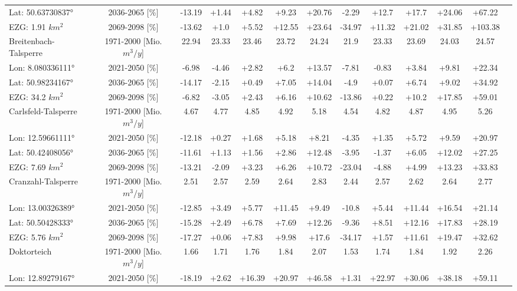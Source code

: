 \begin{longtable}{@{\extracolsep{\fill}}lc|ccccc||cccccc}
Lat: 50.63730837° & 2036-2065 [\%]  & -13.19 & +1.44 & +4.82 & +9.23 & +20.76 & -2.29 & +12.7 & +17.7 & +24.06 & +67.22 & \\ 
EZG: 1.91 $km^2$ & 2069-2098 [\%]  & -13.62 & +1.0 & +5.52 & +12.55 & +23.64 & -34.97 & +11.32 & +21.02 & +31.85 & +103.38 & \\ 
\hline 
Breitenbach-Talsperre & 1971-2000 [Mio. $m^3/y$]  & 22.94 & 23.33 & 23.46 & 23.72 & 24.24 & 21.9 & 23.33 & 23.69 & 24.03 & 24.57 & \\ 
\cline{2-13} 
Lon: 8.080336111° & 2021-2050 [\%]  & -6.98 & -4.46 & +2.82 & +6.2 & +13.57 & -7.81 & -0.83 & +3.84 & +9.81 & +22.34 & \\ 
Lat: 50.98234167° & 2036-2065 [\%]  & -14.17 & -2.15 & +0.49 & +7.05 & +14.04 & -4.9 & +0.07 & +6.74 & +9.02 & +34.92 & \\ 
EZG: 34.2 $km^2$ & 2069-2098 [\%]  & -6.82 & -3.05 & +2.43 & +6.16 & +10.62 & -13.86 & +0.22 & +10.2 & +17.85 & +59.01 & \\ 
\hline 
Carlsfeld-Talsperre & 1971-2000 [Mio. $m^3/y$]  & 4.67 & 4.77 & 4.85 & 4.92 & 5.18 & 4.54 & 4.82 & 4.87 & 4.95 & 5.26 & \\ 
\cline{2-13} 
Lon: 12.59661111° & 2021-2050 [\%]  & -12.18 & +0.27 & +1.68 & +5.18 & +8.21 & -4.35 & +1.35 & +5.72 & +9.59 & +20.97 & \\ 
Lat: 50.42408056° & 2036-2065 [\%]  & -11.61 & +1.13 & +1.56 & +2.86 & +12.48 & -3.95 & -1.37 & +6.05 & +12.02 & +27.25 & \\ 
EZG: 7.69 $km^2$ & 2069-2098 [\%]  & -13.21 & -2.09 & +3.23 & +6.26 & +10.72 & -23.04 & -4.88 & +4.99 & +13.23 & +33.83 & \\ 
\hline 
Cranzahl-Talsperre & 1971-2000 [Mio. $m^3/y$]  & 2.51 & 2.57 & 2.59 & 2.64 & 2.83 & 2.44 & 2.57 & 2.62 & 2.64 & 2.77 & \\ 
\cline{2-13} 
Lon: 13.00326389° & 2021-2050 [\%]  & -12.85 & +3.49 & +5.77 & +11.45 & +9.49 & -10.8 & +5.44 & +11.44 & +16.54 & +21.14 & \\ 
Lat: 50.50428333° & 2036-2065 [\%]  & -15.28 & +2.49 & +6.78 & +7.69 & +12.26 & -9.36 & +8.51 & +12.16 & +17.83 & +28.19 & \\ 
EZG: 5.76 $km^2$ & 2069-2098 [\%]  & -17.27 & +0.06 & +7.83 & +9.98 & +17.6 & -34.17 & +1.57 & +11.61 & +19.47 & +32.62 & \\ 
\hline 
Doktorteich & 1971-2000 [Mio. $m^3/y$]  & 1.66 & 1.71 & 1.76 & 1.84 & 2.07 & 1.53 & 1.74 & 1.84 & 1.92 & 2.26 & \\ 
\cline{2-13} 
Lon: 12.89279167° & 2021-2050 [\%]  & -18.19 & +2.62 & +16.39 & +20.97 & +46.58 & +1.31 & +22.97 & +30.06 & +38.18 & +59.11 & \\ 

\end{longtable}
